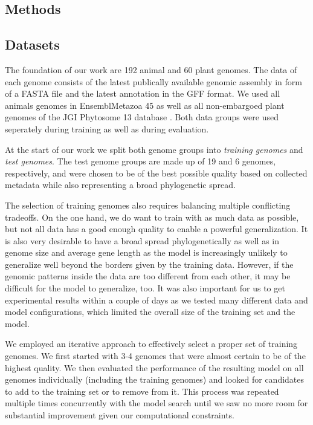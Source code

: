 \documentclass{bioinfo}
\begin{document}
\begin{methods}
\section{Methods}
\subsection{Datasets}
The foundation of our work are 192 animal and 60 plant genomes. The data of each genome consists of the latest publically available genomic assembly in form of a FASTA file and the latest annotation in the GFF format. We used all animals genomes in EnsemblMetazoa 45 \citep{howe2020ensembl} as well as all non-embargoed plant genomes of the JGI Phytosome 13 database \citep{goodstein2012phytozome}. Both data groups were used seperately during training as well as during evaluation. 

At the start of our work we split both genome groups into {\it training genomes} and {\it test genomes}. The test genome groups are made up of 19 and 6 genomes, respectively, and were chosen to be of the best possible quality based on collected metadata while also representing a broad phylogenetic spread. 

The selection of training genomes also requires balancing multiple conflicting tradeoffs. On the one hand, we do want to train with as much data as possible, but not all data has a good enough quality to enable a powerful generalization. It is also very desirable to have a broad spread phylogenetically as well as in genome size and average gene length as the model is increasingly unlikely to generalize well beyond the borders given by the training data. However, if the genomic patterns inside the data are too different from each other, it may be difficult for the model to generalize, too. It was also important for us to get experimental results within a couple of days as we tested many different data and model configurations, which limited the overall size of the training set and the model. 

We employed an iterative approach to effectively select a proper set of training genomes. We first started with 3-4 genomes that were almost certain to be of the highest quality. We then evaluated the performance of the resulting model on all genomes individually (including the training genomes) and looked for candidates to add to the training set or to remove from it. This process was repeated multiple times concurrently with the model search until we saw no more room for substantial improvement given our computational constraints.


\end{methods}
\end{document}
